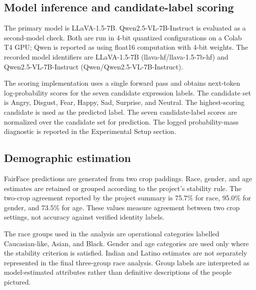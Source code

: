 \documentclass[lettersize,journal]{IEEEtran}
\begin{document}
\subsection{Model inference and candidate-label scoring}
The primary model is LLaVA-1.5-7B. Qwen2.5-VL-7B-Instruct is evaluated as a second-model check. Both are run in 4-bit quantized configurations on a Colab T4 GPU; Qwen is reported as using float16 computation with 4-bit weights. The recorded model identifiers are LLaVA-1.5-7B (llava-hf/llava-1.5-7b-hf) and Qwen2.5-VL-7B-Instruct (Qwen/Qwen2.5-VL-7B-Instruct).

The scoring implementation uses a single forward pass and obtains next-token log-probability scores for the seven candidate expression labels. The candidate set is Angry, Disgust, Fear, Happy, Sad, Surprise, and Neutral. The highest-scoring candidate is used as the predicted label. The seven candidate-label scores are normalized over the candidate set for prediction. The logged probability-mass diagnostic is reported in the Experimental Setup section.

\subsection{Demographic estimation}
FairFace predictions are generated from two crop paddings. Race, gender, and age estimates are retained or grouped according to the project's stability rule. The two-crop agreement reported by the project summary is 75.7\% for race, 95.0\% for gender, and 73.5\% for age. These values measure agreement between two crop settings, not accuracy against verified identity labels.

The race groups used in the analysis are operational categories labelled Caucasian-like, Asian, and Black. Gender and age categories are used only where the stability criterion is satisfied. Indian and Latino estimates are not separately represented in the final three-group race analysis. Group labels are interpreted as model-estimated attributes rather than definitive descriptions of the people pictured.
\end{document}
